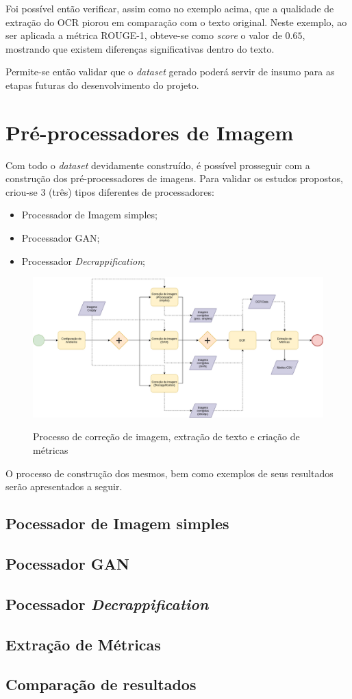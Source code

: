 Foi possível então verificar, assim como no exemplo acima, que a qualidade de extração do OCR piorou em comparação com o texto original. Neste exemplo, ao ser aplicada a métrica ROUGE-1, obteve-se como \textit{score} o valor de $0.65$, mostrando que existem diferenças significativas dentro do texto.

Permite-se então validar que o \textit{dataset} gerado poderá servir de insumo para as etapas futuras do desenvolvimento do projeto.

\section{Pré-processadores de Imagem}

Com todo o \textit{dataset} devidamente construído, é possível prosseguir com a construção dos pré-processadores de imagens. Para validar os estudos propostos, criou-se 3 (três) tipos diferentes de processadores:

\begin{itemize}
  \item Processador de Imagem simples;
  \item Processador GAN;
  \item Processador \textit{Decrappification};
\end{itemize}

\begin{figure}[H]
  \centering
  \caption{Processo de correção de imagem, extração de texto e criação de métricas}
  \includegraphics[scale=.5, angle=270]{figuras/text-extraction-and-comparison-flow.png}
  \label{fig:text-extraction-and-comparison-flow}
\end{figure}

O processo de construção dos mesmos, bem como exemplos de seus resultados serão apresentados a seguir.

\subsection{Pocessador de Imagem simples}
\subsection{Pocessador GAN}
\subsection{Pocessador \textit{Decrappification}}
\subsection{Extração de Métricas}
\subsection{Comparação de resultados}